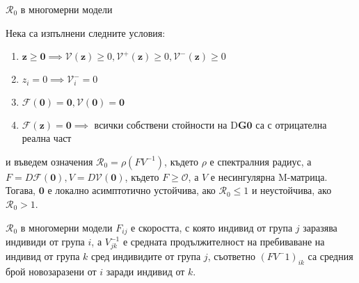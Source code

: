 \begin{frame}[t]{$\mathscr{R}_0$ в многомерни модели}
  \begin{theorem}
    Нека са изпълнени следните условия:
    \begin{enumerate}
      \item $\mathbf{z} \geq \mathbf{0} \implies \mathscr{V}(\mathbf{z}) \geq 0, \mathscr{V}^+(\mathbf{z}) \geq 0, \mathscr{V}^-(\mathbf{z}) \geq 0$
      \item $z_i = 0 \implies \mathscr{V}_{i}^- = 0$
      \item $\mathscr{F}(\mathbf{0}) = \mathbf{0}, \mathscr{V}(\mathbf{0}) = \mathbf{0}$
      \item $\mathscr{F}(\mathbf{z}) = \mathbf{0} \implies$ всички собствени стойности на $\mathrm{D}\mathbf{G}{\mathbf{0}}$ са с отрицателна реална част
    \end{enumerate}
    и въведем означения $\mathscr{R}_0 = \rho(F V^{-1})$, където $\rho$ е спектралния радиус, а $F = D\mathscr{F}(\mathbf{0}), V = D\mathscr{V}(\mathbf{0})$, където $F \geq \mathscr{O}$, а $V$ е несингулярна M-матрица. \\
    Тогава, $\mathbf{0}$ е локално асимптотично устойчива, ако $\mathscr{R}_0 \leq 1$ и неустойчива, ако $\mathscr{R}_0 > 1$.
  \end{theorem}
\end{frame}

\begin{frame}[t]{$\mathscr{R}_0$ в многомерни модели}
  $F_{ij}$ е скоростта, с която индивид от група $j$ заразява индивиди от група $i$, а $V^{-1}_{jk}$ е средната продължителност на пребиваване на индивид от група $k$ сред индивидите от група $j$, съответно $(F V^-1)_{ik}$ са средния брой новозаразени от $i$ заради индивид от $k$.
\end{frame}

